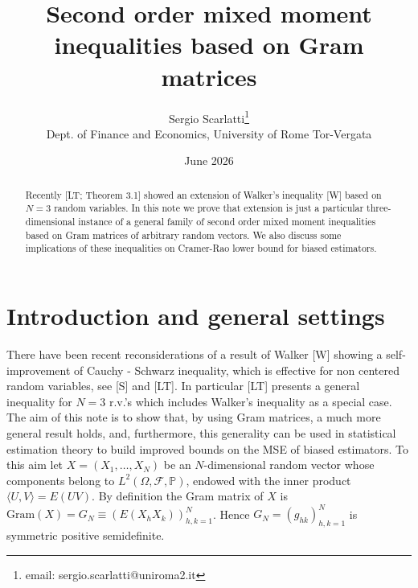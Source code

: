 \documentclass[11pt]{article}
\title{ Second order mixed moment inequalities based on Gram matrices}
\author{Sergio Scarlatti\footnote{email: sergio.scarlatti@uniroma2.it}
\\
Dept. of Finance and Economics, University of Rome Tor-Vergata}\date{June 2026}
\begin{document}
\maketitle

\begin{abstract}
Recently [LT; Theorem 3.1] showed an extension of Walker's inequality [W] based on $N=3$ random variables. In this note we prove that extension is just a particular three-dimensional instance of a  general family  of second order mixed moment inequalities based on Gram matrices of arbitrary random vectors. We also discuss some implications of these inequalities on Cramer-Rao lower bound for biased estimators.
\end{abstract}

\section{Introduction and general settings}

There have been recent reconsiderations of a result of Walker [W] showing a self-improvement of Cauchy - Schwarz inequality, which is effective for non centered random variables, see [S] and [LT]. In particular [LT] presents a general inequality for $N=3$ r.v.'s which includes Walker's inequality as a special case. The aim of this note is to show that, by using Gram matrices,  a much more general result holds, and, furthermore, this generality can be used in statistical estimation theory to build improved bounds on the MSE of biased estimators. To this aim let $X=(X_1,\dots,X_N)$ be an $N$-dimensional random vector whose components belong to $L^2(\Omega,\mathcal F,\mathbb P)$, endowed with the inner product $\langle U,V\rangle=E(UV)$. By definition the Gram matrix of $X$ is $\text{Gram}(X)=G_N\equiv (E(X_hX_k))_{h,k=1}^N$. Hence $G_N=({g}_{hk})_{h,k=1}^N$ is symmetric positive semidefinite.
\end{document}
